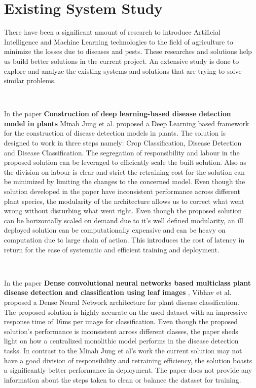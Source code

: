 \label{chap.2}


\section{Existing System Study}

There have been a significant amount of research to introduce Artificial Intelligence and Machine Learning technologies to the field of agriculture to minimize the losses due to diseases and pests. These researches and solutions help us build better solutions in the current project. An extensive study is done to explore and analyze the existing systems and solutions that are trying to solve similar problems.

\

In the paper \textbf{Construction of deep learning-based disease detection model in plants} Minah Jung et al. proposed a Deep Learning based framework for the construction of disease detection models in plants. The solution is designed to work in three steps namely: Crop Classification, Disease Detection and Disease Classification\cite{jung2023construction}. The segregation of responsibility and labour in the proposed solution can be leveraged to efficiently scale the built solution. Also as the division on labour is clear and strict the retraining cost for the solution can be minimized by limiting the changes to the concerned model. Even though the solution developed in the paper have inconsistent performance across different plant species, the modularity of the architecture allows us to correct what went wrong without disturbing what went right. Even though the proposed solution can be horizontally scaled on demand due to it's well defined modularity, an ill deployed solution can be computationally expensive and can be heavy on computation due to large chain of action. This introduces the cost of latency in return for the ease of systematic and efficient training and deployment. 

\

In the paper \textbf{Dense convolutional neural networks based multiclass plant disease detection and classification using leaf images }, Vibhav et al. proposed a Dense Neural Network architecture for plant disease classification. The proposed solution is highly accurate on the used dataset with an impressive response time of 16ms per image for classification. Even though the proposed solution's performance is inconsistent across different classes, the paper sheds light on how a centralized monolithic model performs in the disease detection tasks. In contrast to the Minah Jung et al's work the current solution may not have a good division of responsibility and retraining efficiency, the solution boasts a significantly better performance in deployment. The paper does not provide any information about the steps taken to clean or balance the dataset for training.

